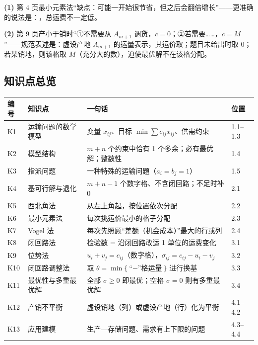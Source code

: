 \begin{correctionbox}[6. 两处表述不严谨]
\textbf{(1)} 第 4 页最小元素法“缺点：可能一开始很节省，但之后会翻倍增长”——更准确的说法是：，总运费不一定低。\par
\textbf{(2)} 第 9 页产小于销时“①不需要从 $A_{m+1}$ 调货，$c=0$；②若需要……，$c=M$”——规范表述是：虚设产地 $A_{m+1}$ 的运量表示，其运价取；题目未给出时取 0；若某销地，则该格取 $M$（充分大的数），迫使最优解不在该格分配。
\end{correctionbox}

\subsection*{知识点总览}
\begin{center}
\small
\begin{tabularx}{\linewidth}{@{}l l X l@{}}
\toprule
\textbf{编号} & \textbf{知识点} & \textbf{一句话} & \textbf{位置}\\
\midrule
K1 & 运输问题的数学模型 & 变量 $x_{ij}$、目标 $\min\sum c_{ij}x_{ij}$、供需约束 & 1.1--1.3\\
K2 & 模型结构 & $m+n$ 个约束中恰有 1 个多余；必有最优解；整数性 & 1.4\\
K3 & 指派问题 & 一种特殊的运输问题（$a_i=b_j=1$） & 1.5\\
K4 & 基可行解与退化 & $m+n-1$ 个数字格、不含闭回路；不足时补 0 & 2.1\\
K5 & 西北角法 & 从左上角起，按位置依次分配 & 2.2\\
K6 & 最小元素法 & 每次挑运价最小的格子分配 & 2.3\\
K7 & Vogel 法 & 每次先照顾“差额（机会成本）”最大的行或列 & 2.4\\
K8 & 闭回路法 & 检验数 = 沿闭回路改运 1 单位的运费变化 & 3.1\\
K9 & 位势法 & $u_i+v_j=c_{ij}$（数字格），$\sigma_{ij}=c_{ij}-u_i-v_j$ & 3.2\\
K10 & 闭回路调整法 & 取 $\theta=\min\{\text{“$-$”格运量}\}$ 进行换基 & 3.3\\
K11 & 最优性与多重最优解 & 全部 $\sigma\ge0$ 即最优；空格 $\sigma=0$ 则有多重最优解 & 3.4\\
K12 & 产销不平衡 & 虚设销地（列）或虚设产地（行）化为平衡 & 4.1--4.2\\
K13 & 应用建模 & 生产—存储问题、需求有上下限的问题 & 4.3--4.4\\
\bottomrule
\end{tabularx}
\end{center}

